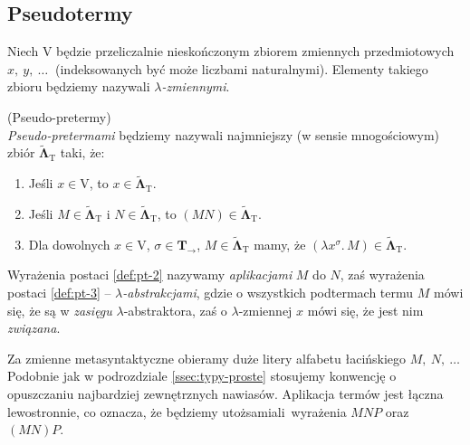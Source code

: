 \subsection{Pseudotermy}
  Niech \(\mathrm{V}\) będzie przeliczalnie nieskończonym zbiorem zmiennych przedmiotowych \(x,\ y,\ \dots\ \) (indeksowanych być może liczbami naturalnymi). Elementy takiego zbioru będziemy nazywali \emph{\(\lambda\)-zmiennymi}.
\begin{definicja}(Pseudo-pretermy)\\
  \emph{Pseudo-pretermami} będziemy nazywali najmniejszy (w sensie mnogościowym) zbiór \(\mathbf{\tilde\Lambda}_{\mathrm{T}}\) taki, że:

\begin{enumerate}[label=PT\arabic*.]
  \item Jeśli \(x\in \mathrm{V}\), to \(x\in{\mathbf{\tilde\Lambda}}_{\mathrm{T}}\).\label{def:pt-1}
  \item Jeśli \(M\in\mathbf{\tilde{\Lambda}}_{\mathrm{T}}\) i \(N\in\mathbf{\tilde{\Lambda}}_{\mathrm{T}}\), to \((MN)\in\mathbf{\tilde{\Lambda}}_{\mathrm{T}}\).\label{def:pt-2}
  \item Dla dowolnych \(x\in \mathrm{V}\), \(\sigma\in\mathbf{T}_\to\), \(M\in\mathbf{\tilde{\Lambda}}_{\mathrm{T}}\) mamy, że \((\lambda x^{\sigma}.\,M)\in \mathbf{\tilde{\Lambda}}_{\mathrm{T}}\).\label{def:pt-3}
  \end{enumerate}
\end{definicja}
  Wyrażenia postaci \ref{def:pt-2} nazywamy \emph{aplikacjami} \(M\) do \(N\), zaś wyrażenia postaci \ref{def:pt-3} -- \emph{\(\lambda\)-abstrakcjami}, gdzie o wszystkich podtermach termu \(M\) mówi się, że są w \emph{zasięgu} \(\lambda\)-abstraktora, zaś o \(\lambda\)-zmiennej \(x\) mówi się, że jest nim \emph{związana}.

  Za zmienne metasyntaktyczne obieramy duże litery alfabetu łacińskiego \(M,\ N,\ \dots\ \) Podobnie jak w podrozdziale \ref{ssec:typy-proste} stosujemy konwencję o opuszczaniu najbardziej zewnętrznych nawiasów. Aplikacja termów jest łączna lewostronnie, co oznacza, że będziemy utożsamiali wyrażenia \(MNP\) oraz \((MN)P\).

\newpage

